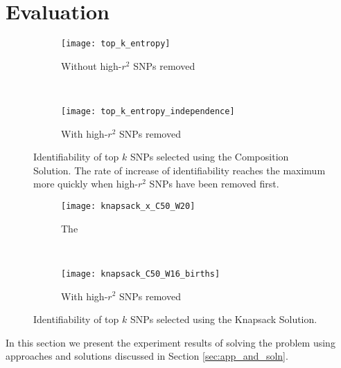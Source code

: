 \documentclass[14pt, oneside]{article}   	%
\begin{document}
\section{Evaluation}
\begin{figure}[t]
    \centering
    \begin{subfigure}{0.45\textwidth}
        \texttt{[image: top\_k\_entropy]}
        \caption{Without high-$r^2$ SNPs removed}
        \label{fig:ent}
    \end{subfigure}
    ~ %
    \begin{subfigure}{0.45\textwidth}
        \texttt{[image: top\_k\_entropy\_independence]}
        \caption{With high-$r^2$ SNPs removed}
        \label{fig:ent_indep}
    \end{subfigure}
    \caption{Identifiability of top $k$ SNPs selected using the Composition Solution.
                  The rate of increase of identifiability reaches the maximum more quickly when high-$r^2$ SNPs have been removed first.}
    \label{fig:topk_ents}
\end{figure}
\begin{figure}[t]
    \centering
    \begin{subfigure}{0.45\textwidth}
        \texttt{[image: knapsack\_x\_C50\_W20]}
        \caption{The }
        \label{fig:C50W20}
    \end{subfigure}
    ~ %
    \begin{subfigure}{0.45\textwidth}
        \texttt{[image: knapsack\_C50\_W16\_births]}
        \caption{With high-$r^2$ SNPs removed}
        \label{fig:C50W16births}
    \end{subfigure}
    \caption{Identifiability of top $k$ SNPs selected using the Knapsack Solution.}
    \label{fig:topk_ents}
\end{figure}

In this section we present the experiment results of solving the problem using approaches and solutions discussed in Section \ref{sec:app_and_soln}.
\end{document}
